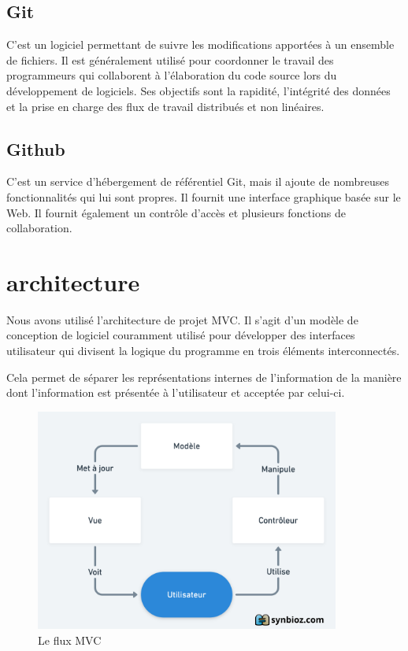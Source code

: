 \documentclass[a4paper, 10p]{report}
\begin{document}
		\subsection*{Git} C'est un logiciel permettant de suivre les modifications apportées à un ensemble de fichiers. Il est généralement utilisé pour coordonner le travail des programmeurs qui collaborent à l'élaboration du code source lors du développement de logiciels. Ses objectifs sont la rapidité, l'intégrité des données et la prise en charge des flux de travail distribués et non linéaires.

		\subsection*{Github} C'est un service d'hébergement de référentiel Git, mais il ajoute de nombreuses fonctionnalités qui lui sont propres. Il fournit une interface graphique basée sur le Web. Il fournit également un contrôle d'accès et plusieurs fonctions de collaboration.
	\section{architecture} %
		Nous avons utilisé l'architecture de projet MVC. Il s'agit d'un modèle de conception de logiciel couramment utilisé pour développer des interfaces utilisateur qui divisent la logique du programme en trois éléments interconnectés.

Cela permet de séparer les représentations internes de l'information de la manière dont l'information est présentée à l'utilisateur et acceptée par celui-ci.
\begin{figure}[!h]
  \center
  \includegraphics[width=10cm]{mvc.png}
  \caption{Le flux MVC}
  \label{fig:fluxmvc}
\end{figure}
\end{document}
